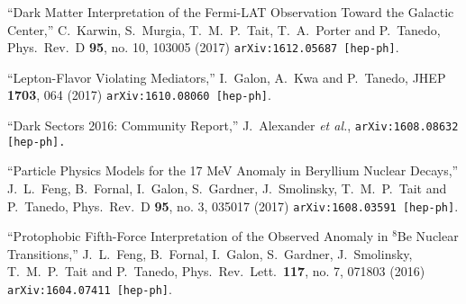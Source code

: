 \documentclass[margin,line]{resume}
\begin{document}
\begin{resume}
  ``Dark Matter Interpretation of the Fermi-LAT Observation Toward the Galactic Center,''
  C.~Karwin, S.~Murgia, T.~M.~P.~Tait, T.~A.~Porter and P.~Tanedo,
  Phys.\ Rev.\ D {\bf 95}, no. 10, 103005 (2017)
  \texttt{arXiv:1612.05687 [hep-ph]}.
	\vspace{-2mm}

    
  ``Lepton-Flavor Violating Mediators,''
  I.~Galon, A.~Kwa and P.~Tanedo,
  JHEP {\bf 1703}, 064 (2017)
  \texttt{arXiv:1610.08060 [hep-ph]}.
	\vspace{-2mm}
  
``Dark Sectors 2016:%
 Community Report,'' 
  J.~Alexander {\it et al.},
  \texttt{arXiv:1608.08632 [hep-ph].}
  \vspace{-2mm}

``Particle Physics Models for the 17 MeV Anomaly in Beryllium Nuclear Decays,''
  J.~L.~Feng, B.~Fornal, I.~Galon, S.~Gardner, J.~Smolinsky, T.~M.~P.~Tait and P.~Tanedo,
  Phys.\ Rev.\ D {\bf 95}, no. 3, 035017 (2017)
  \texttt{arXiv:1608.03591 [hep-ph]}.
    \vspace{-2mm}
  
``Protophobic Fifth-Force Interpretation of the Observed Anomaly in $^8$Be Nuclear Transitions,''  
J.~L.~Feng, B.~Fornal, I.~Galon, S.~Gardner, J.~Smolinsky, T.~M.~P.~Tait and P.~Tanedo,
  Phys.\ Rev.\ Lett.\  {\bf 117}, no. 7, 071803 (2016)
  \texttt{arXiv:1604.07411 [hep-ph]}.
  \vspace{-2mm}
  

\end{resume}
\end{document}
